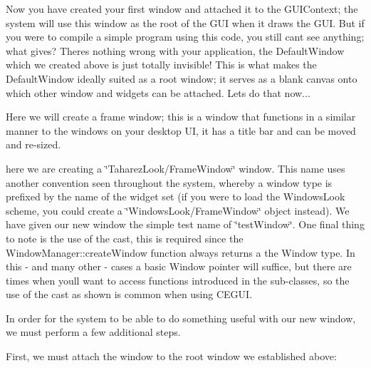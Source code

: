 Now you have created your first window and attached it to the G\+U\+I\+Context; the system will use this window as the root of the G\+UI when it draws the G\+UI. But if you were to compile a simple program using this code, you still can\textquotesingle{}t see anything; what gives? There\textquotesingle{}s nothing wrong with your application, the Default\+Window which we created above is just totally invisible! This is what makes the Default\+Window ideally suited as a root window; it serves as a blank canvas onto which other window and widgets can be attached. Let\textquotesingle{}s do that now...

Here we will create a frame window; this is a window that functions in a similar manner to the windows on your desktop UI, it has a title bar and can be moved and re-\/sized. 
\begin{DoxyCode}{0}
\end{DoxyCode}


here we are creating a {\ttfamily \char`\"{}\+Taharez\+Look/\+Frame\+Window\char`\"{}} window. This name uses another convention seen throughout the system, whereby a window type is prefixed by the name of the widget set (if you were to load the Windows\+Look scheme, you could create a {\ttfamily \char`\"{}\+Windows\+Look/\+Frame\+Window\char`\"{}} object instead). We have given our new window the simple test name of {\ttfamily \char`\"{}test\+Window\char`\"{}}. One final thing to note is the use of the cast, this is required since the Window\+Manager\+::create\+Window function always returns a the Window type. In this -\/ and many other -\/ cases a basic Window pointer will suffice, but there are times when you\textquotesingle{}ll want to access functions introduced in the sub-\/classes, so the use of the cast as shown is common when using C\+E\+G\+UI.

In order for the system to be able to do something useful with our new window, we must perform a few additional steps.

First, we must attach the window to the root window we established above\+: 
\begin{DoxyCode}{0}
\end{DoxyCode}



